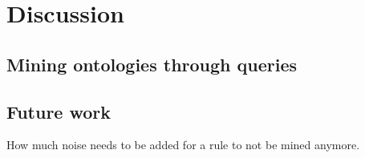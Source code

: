 \chapter{Discussion}


\section{Mining ontologies through queries}


\section{Future work}
How much noise needs to be added for a rule to not be mined anymore.